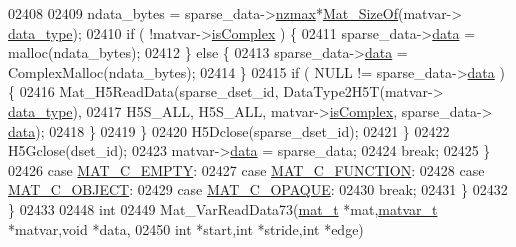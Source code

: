 \begin{DoxyCode}
{{{{{{{{{{02408 
02409                     ndata\_bytes = sparse\_data->\hyperlink{group___m_a_t_ad79471861cb948e32671be6d4089173a}{nzmax}*\hyperlink{group__mat__util_gab6774aabdc124c540c1e7686d0804940}{Mat\_SizeOf}(matvar->
      \hyperlink{group___m_a_t_ab6aafe9bd77f0f077852593dec438144}{data\_type});
02410                     \textcolor{keywordflow}{if} ( !matvar->\hyperlink{group___m_a_t_aeb03b3a69f108dc05470b00443a43739}{isComplex} ) \{
02411                         sparse\_data->\hyperlink{group___m_a_t_ae2c648cb9eac4ce47f26cddb44246152}{data} = malloc(ndata\_bytes);
02412                     \} \textcolor{keywordflow}{else} \{
02413                         sparse\_data->\hyperlink{group___m_a_t_ae2c648cb9eac4ce47f26cddb44246152}{data} = ComplexMalloc(ndata\_bytes);
02414                     \}
02415                     \textcolor{keywordflow}{if} ( NULL != sparse\_data->\hyperlink{group___m_a_t_ae2c648cb9eac4ce47f26cddb44246152}{data} ) \{
02416                         Mat\_H5ReadData(sparse\_dset\_id, DataType2H5T(matvar->
      \hyperlink{group___m_a_t_ab6aafe9bd77f0f077852593dec438144}{data\_type}),
02417                             H5S\_ALL, H5S\_ALL, matvar->\hyperlink{group___m_a_t_aeb03b3a69f108dc05470b00443a43739}{isComplex}, sparse\_data->
      \hyperlink{group___m_a_t_ae2c648cb9eac4ce47f26cddb44246152}{data});
02418                     \}
02419                 \}
02420                 H5Dclose(sparse\_dset\_id);
02421             \}
02422             H5Gclose(dset\_id);
02423             matvar->\hyperlink{group___m_a_t_a5672978efa230bbdecdf38ede781f7fa}{data} = sparse\_data;
02424             \textcolor{keywordflow}{break};
02425         \}
02426         \textcolor{keywordflow}{case} \hyperlink{group___m_a_t_ggad4d60ae7b709fc81bfd744fb4c857c40a5c76eef0ca0373d25abe49053be6fa9a}{MAT\_C\_EMPTY}:
02427         \textcolor{keywordflow}{case} \hyperlink{group___m_a_t_ggad4d60ae7b709fc81bfd744fb4c857c40aaa9bf08312779cd1ab8e504a162ddcea}{MAT\_C\_FUNCTION}:
02428         \textcolor{keywordflow}{case} \hyperlink{group___m_a_t_ggad4d60ae7b709fc81bfd744fb4c857c40afe45104b68b044c83a2f99e349fa1ea6}{MAT\_C\_OBJECT}:
02429         \textcolor{keywordflow}{case} \hyperlink{group___m_a_t_ggad4d60ae7b709fc81bfd744fb4c857c40ad83c684d250e463c1a3779647695c0c9}{MAT\_C\_OPAQUE}:
02430             \textcolor{keywordflow}{break};
02431     \}
02432 \}
02433 
02448 \textcolor{keywordtype}{int}
02449 Mat\_VarReadData73(\hyperlink{struct__mat__t}{mat\_t} *mat,\hyperlink{group___m_a_t_structmatvar__t}{matvar\_t} *matvar,\textcolor{keywordtype}{void} *data,
02450           \textcolor{keywordtype}{int} *start,\textcolor{keywordtype}{int} *stride,\textcolor{keywordtype}{int} *edge)
}}}}}}}}}}
\end{DoxyCode}

